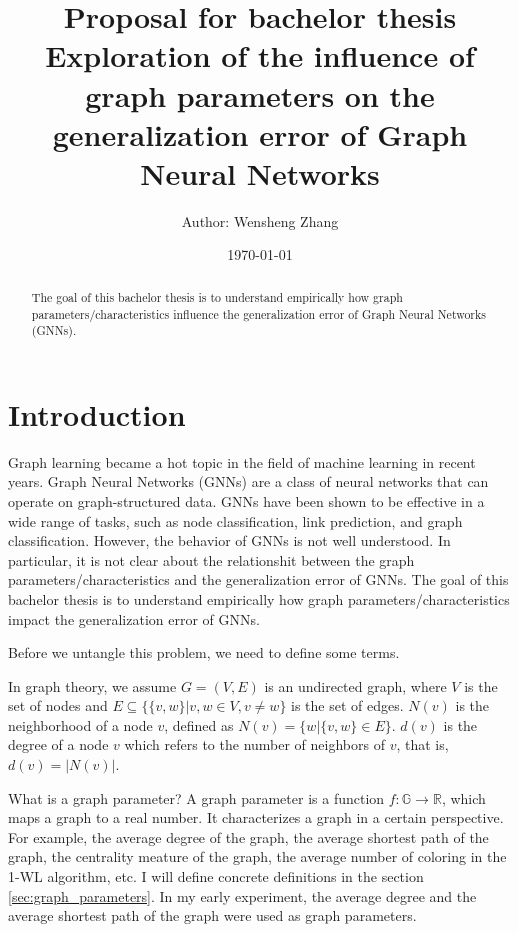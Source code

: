\documentclass{article}
\title{\textbf{Proposal for bachelor thesis}\\
Exploration of the influence of graph parameters on the generalization error of Graph Neural Networks}
\author{Author: Wensheng Zhang}
\date{\today}
\begin{document}
 

\maketitle



\begin{abstract}
The goal of this bachelor thesis is to understand empirically how graph parameters/characteristics influence the generalization error of Graph Neural Networks (GNNs).
\end{abstract}


\section{Introduction}

Graph learning became a hot topic in the field of machine learning in recent years. Graph Neural Networks (GNNs) are a class of neural networks that can operate on graph-structured data. GNNs have been shown to be effective in a wide range of tasks, such as node classification, link prediction, and graph classification. However, the behavior of GNNs is not well understood. In particular, it is not clear about the relationshit between the graph parameters/characteristics and the generalization error of GNNs. The goal of this bachelor thesis is to understand empirically how graph parameters/characteristics impact the generalization error of GNNs. 

Before we untangle this problem, we need to define some terms.

In graph theory, we assume $G=(V,E)$ is an undirected graph, where $V$ is the set of nodes and $E  \subseteq \{\{v,w\}|v,w \in V , v \neq w\}$ is the set of edges. $N(v)$ is the neighborhood of a node $v$, defined as $N(v) = \{w | \{v,w\} \in E\}$. $d(v)$ is the degree of a node $v$ which refers to the number of neighbors of $v$, that is, $d(v) = |N(v)|$. 

What is a graph parameter?  A graph parameter is a function $f: \mathbb{G} \rightarrow \mathbb{R}$, which maps a graph to a real number. It characterizes a graph in a certain perspective.
For example, the average degree of the graph, the average shortest path of the graph, the centrality meature of the graph, the average number of coloring in the 1-WL algorithm, etc. I will define concrete definitions in the section \ref{sec:graph_parameters}. In my early experiment, the average degree and the average shortest path of the graph were used as graph parameters.
\end{document}
